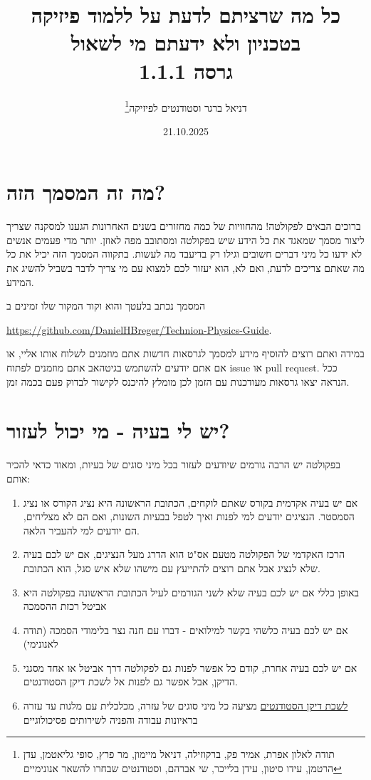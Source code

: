 \documentclass[a4paper,12pt]{article}
\title{כל מה שרציתם לדעת על ללמוד פיזיקה בטכניון ולא ידעתם מי לשאול\\
        \large גרסה 1.1.1}
\author{דניאל ברגר וסטודנטים לפיזיקה\footnote{תודה לאלון אפרת, אמיר פק, ברקוזילה, דניאל מיימון, מר פרץ, סופי גליאטמן, עדן הרטמן, עידו סיטון, עידן בלייכר, שי אברהם, וסטודנטים שבחרו להשאר אנונימיים}}
\date{21.10.2025}
\begin{document}
\maketitle
\tableofcontents

\newpage

\section{מה זה המסמך הזה?}

ברוכים הבאים לפקולטה! מהחוויות של כמה מחזורים בשנים האחרונות הגענו למסקנה שצריך ליצור מסמך שמאגד את כל הידע שיש בפקולטה ומסתובב מפה לאוזן. יותר מדי פעמים אנשים לא ידעו כל מיני דברים חשובים וגילו רק בדיעבד מה לעשות. בתקווה המסמך הזה יכיל את כל מה שאתם צריכים לדעת, ואם לא, הוא יעזור לכם למצוא עם מי צריך לדבר בשביל להשיג את המידע.

המסמך נכתב בלעטך והוא וקוד המקור שלו זמינים ב 

\textenglish{\url{https://github.com/DanielHBreger/Technion-Physics-Guide}}.

במידה ואתם רוצים להוסיף מידע למסמך לגרסאות חדשות אתם מוזמנים לשלוח אותו אליי, או אם אתם יודעים להשתמש בגיטהאב אתם מוזמנים לפתוח \textenglish{issue} או \textenglish{pull request}. ככל הנראה יצאו גרסאות מעודכנות עם הזמן לכן מומלץ להיכנס לקישור לבדוק פעם בכמה זמן.

\section{יש לי בעיה - מי יכול לעזור?}

בפקולטה יש הרבה גורמים שיודעים לעזור בכל מיני סוגים של בעיות, ומאוד כדאי להכיר אותם:

\begin{enumerate}
    \item אם יש בעיה אקדמית בקורס שאתם לוקחים, הכתובת הראשונה היא נציג הקורס או נציג הסמסטר. הנציגים יודעים למי לפנות ואיך לטפל בבעיות השונות, ואם הם לא מצליחים, הם יודעים למי להעביר הלאה.
    \item הרכז האקדמי של הפקולטה מטעם אס"ט הוא הדרג מעל הנציגים, אם יש לכם בעיה שלא לנציג אבל אתם רוצים להתייעץ עם מישהו שלא איש סגל, הוא הכתובת.
    \item באופן כללי אם יש לכם בעיה שלא לשני הגורמים לעיל הכתובת הראשונה בפקולטה היא אביטל רכזת ההסמכה
    \item אם יש לכם בעיה כלשהי בקשר למילואים - דברו עם חנה נצר בלימודי הסמכה (תודה לאנונימי)
    \item אם יש לכם בעיה אחרת, קודם כל אפשר לפנות גם לפקולטה דרך אביטל או אחד מסגני הדיקן, אבל אפשר גם לפנות אל לשכת דיקן הסטודנטים.
    \item \href{https://dean.technion.ac.il/}{לשכת דיקן הסטודנטים} מציעה כל מיני סוגים של עזרה, מכלכלית עם מלגות עד עזרה בראיונות עבודה והפניה לשירותים פסיכולוגיים
\end{enumerate}
\end{document}
